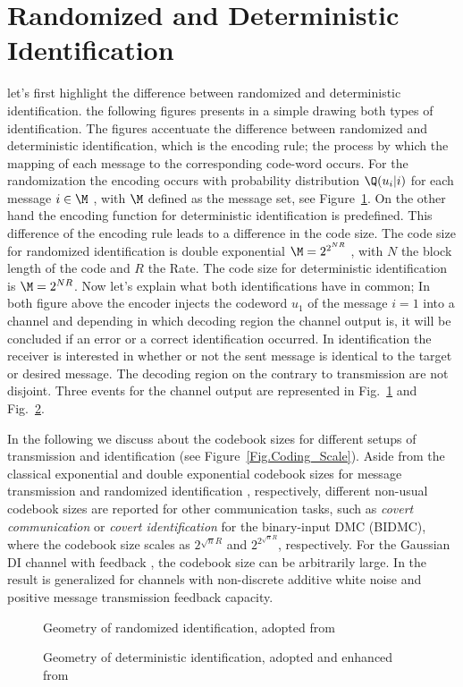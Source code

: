 \section{Randomized and Deterministic Identification}
let's first highlight the difference between randomized and deterministic identification. the following figures presents in a simple drawing both types of identification. The figures accentuate the difference between randomized and deterministic identification, which is the encoding rule; the process by which the mapping of each message to the corresponding code-word occurs. For the randomization the encoding occurs with probability distribution $\Q(u_i|i)$ for each message $ i\in\M\ $, with $\M$ defined as the message set, see Figure~\ref{RandomizedID}. On the other hand the encoding function for deterministic identification is predefined. This difference of the encoding rule leads to a difference in the code size. The code size for randomized identification is double exponential $\M = 2^{2^{NR}}$ \cite{AD89,Ahlswede21_Book}, with $N$ the block length of the code and $R$ the Rate. The code size for deterministic identification is $\M = 2^{NR}$. Now let's explain what both identifications have in common; In both figure above the encoder injects the codeword $u_1$ of the message $i=1$ into a channel and depending in which decoding region the channel output is, it will be concluded if an error or a correct identification occurred. In identification the receiver is interested in whether or not the sent message is identical to the target or desired message. The decoding region on the contrary to transmission are not disjoint. Three events for the channel output are represented in Fig.~\ref{RandomizedID} and Fig.~\ref{DeterministicID}.

In the following we discuss about the codebook sizes for different setups of transmission and identification (see Figure~\ref{Fig.Coding_Scale}). Aside from the classical exponential and double exponential codebook sizes for message transmission \cite{S48} and randomized identification \cite{AD89,Ahlswede21_Book}, respectively, different non-usual codebook sizes are reported for other communication tasks, such as \emph{covert communication} \cite{Bloch16} or \emph{covert identification} \cite{ZT20} for the binary-input DMC (BIDMC), where the codebook size scales as $2^{\sqrt{n}R}$ and $2^{2^{\sqrt{n}R}}$, respectively. For the Gaussian DI channel with feedback \cite{Labidi21}, the codebook size can be arbitrarily large. In \cite{Wiese22} the result is generalized for channels with non-discrete additive white noise and positive message transmission feedback capacity.
\begin{figure}[t]
\centerline{}
\caption{Geometry of randomized identification, adopted from \cite{COCO20_Talk}}
\label{RandomizedID}
\end{figure}
\begin{figure}[!b]
\centerline{}
\caption{Geometry of deterministic identification, adopted and enhanced from \cite{NEWCOM20_Talk}}
\label{DeterministicID}
\end{figure}

